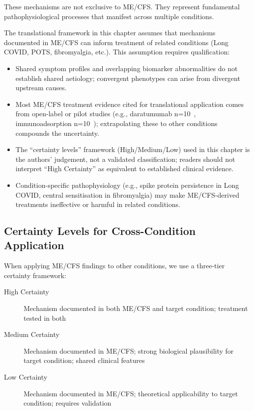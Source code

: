 These mechanisms are not exclusive to ME/CFS. They represent fundamental pathophysiological processes that manifest across multiple conditions.

\begin{limitation}
The translational framework in this chapter assumes that mechanisms documented in ME/CFS can inform treatment of related conditions (Long COVID, POTS, fibromyalgia, etc.). This assumption requires qualification:
\begin{itemize}
    \item Shared symptom profiles and overlapping biomarker abnormalities do not establish shared aetiology; convergent phenotypes can arise from divergent upstream causes.
    \item Most ME/CFS treatment evidence cited for translational application comes from open-label or pilot studies (e.g., daratumumab n=10~\cite{Fluge2025daratumumab}, immunoadsorption n=10~\cite{Scheibenbogen2018immunoadsorption}); extrapolating these to other conditions compounds the uncertainty.
    \item The ``certainty levels'' framework (High/Medium/Low) used in this chapter is the authors' judgement, not a validated classification; readers should not interpret ``High Certainty'' as equivalent to established clinical evidence.
    \item Condition-specific pathophysiology (e.g., spike protein persistence in Long COVID, central sensitisation in fibromyalgia) may make ME/CFS-derived treatments ineffective or harmful in related conditions.
\end{itemize}
\end{limitation}

\subsection{Certainty Levels for Cross-Condition Application}

When applying ME/CFS findings to other conditions, we use a three-tier certainty framework:

\begin{description}
    \item[High Certainty] Mechanism documented in both ME/CFS and target condition; treatment tested in both
    \item[Medium Certainty] Mechanism documented in ME/CFS; strong biological plausibility for target condition; shared clinical features
    \item[Low Certainty] Mechanism documented in ME/CFS; theoretical applicability to target condition; requires validation
\end{description}

